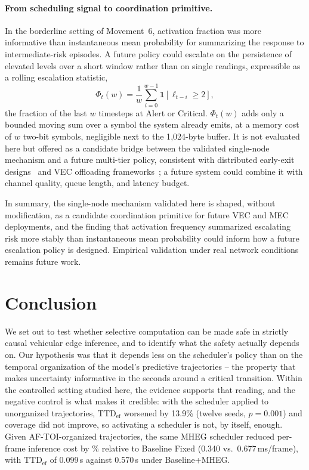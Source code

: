 \documentclass[a4paper,fleqn]{cas-dc}
\newcommand{\MHEG}{\mbox{MHEG}\xspace}
\begin{document}
\paragraph{From scheduling signal to coordination primitive.}
In the borderline setting of Movement~6, activation fraction was more
informative than instantaneous mean probability for summarizing the response to
intermediate-risk episodes. A future policy could escalate on the persistence of
elevated levels over a short window rather than on single readings, expressible
as a rolling escalation statistic,
\begin{equation}
  \Phi_t(w) = \frac{1}{w}\sum_{i=0}^{w-1} \mathbf{1}\!\left[\ell_{t-i}
  \ge 2\right],
  \label{eq:escalation}
\end{equation}
the fraction of the last $w$ timesteps at Alert or Critical. $\Phi_t(w)$ adds
only a bounded moving sum over a symbol the system already emits, at a memory
cost of $w$ two-bit symbols, negligible next to the 1{,}024-byte buffer. It is
not evaluated here but offered as a candidate bridge between the validated
single-node mechanism and a future multi-tier policy, consistent with
distributed early-exit designs~\cite{peng2025distree} and VEC offloading
frameworks~\cite{uddin2025taskoffloading,abouali2025edgeai}; a future system
could combine it with channel quality, queue length, and latency budget.

In summary, the single-node mechanism validated here is shaped, without
modification, as a candidate coordination primitive for future VEC and MEC
deployments, and the finding that activation frequency summarized escalating
risk more stably than instantaneous mean probability could inform how a future
escalation policy is designed. Empirical validation under real network
conditions remains future work.
\section{Conclusion}
\label{sec:conclusao}
We set out to test whether selective computation can be made safe in strictly
causal vehicular edge inference, and to identify what the safety actually
depends on. Our hypothesis was that it depends less on the scheduler's policy than
on the temporal organization of the model's predictive trajectories -- the property
that makes uncertainty informative in the seconds around a critical transition.
Within the controlled setting studied here, the evidence supports that reading, and
the negative control is what makes it credible: with the scheduler applied to
unorganized trajectories, $\mathrm{TTD}_{\mathrm{ef}}$ worsened by
{\color{\revcolor}13.9\% (twelve seeds, $p=0.001$)} and
coverage did not improve, so activating a scheduler is not, by itself, enough.
{\color{\revcolor}Given \mbox{AF-TOI}-organized trajectories, the same \MHEG
scheduler reduced per-frame inference cost by \CostReduction\% relative to
Baseline Fixed (0.340 vs.\ 0.677\,ms/frame), with
$\mathrm{TTD}_{\mathrm{ef}}$ of 0.099\,s against 0.570\,s under
Baseline+MHEG}.
\end{document}
